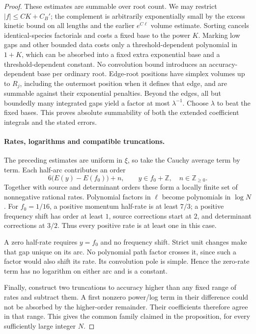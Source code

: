\begin{proof}
These estimates are summable over root count. We may restrict
\(|f|\le CK+C_B'\); the complement is arbitrarily exponentially small
by the excess kinetic bound on all lengths and the earlier
\(e^{C\ell}\) volume estimate. Sorting cancels identical-species
factorials and costs a fixed base to the power \(K\). Marking low gaps
and other bounded data costs only a threshold-dependent polynomial in
\(1+K\), which can be absorbed into a fixed extra exponential base and
a threshold-dependent constant. No convolution bound introduces an
accuracy-dependent base per ordinary root. Edge-root positions have
simplex volumes up to \(R_j\), including the outermost position when
it defines that edge, and are summable against their exponential
penalties. Beyond the edges, all but boundedly many integrated gaps
yield a factor at most \(\lambda^{-1}\). Choose \(\lambda\) to beat
the fixed bases. This proves absolute summability of both the extended
coefficient integrals and the stated errors.

\paragraph{Rates, logarithms and compatible truncations.}
The preceding estimates are uniform in \(\xi\), so take the Cauchy
average term by term. Each half-arc contributes an order
\[
 6\bigl(E(y)-E(f_0)\bigr)+n,
       \qquad y\in f_0+\mathbb Z,\quad n\in\mathbb Z_{\ge0}.
\]
Together with source and determinant orders these form a locally finite
set of nonnegative rational rates. Polynomial factors in \(\ell\)
become polynomials in \(\log N\). For \(f_0=1/16\), a positive
momentum half-rate is at least \(7/3\); a positive frequency shift has
order at least \(1\), source corrections start at \(2\), and
determinant corrections at \(3/2\). Thus every positive rate is at
least one in this case.

A zero half-rate requires \(y=f_0\) and no frequency shift. Strict
unit changes make that gap unique on its arc. No polynomial path
factor crosses it, since such a factor would also shift its rate.
Its convolution pole is simple. Hence the zero-rate term has no
logarithm on either arc and is a constant.

Finally, construct two truncations to accuracy higher than any fixed
range of rates and subtract them. A first nonzero power/log term in
their difference could not be absorbed by the higher-order remainder.
Their coefficients therefore agree in that range. This gives the
common family claimed in the proposition, for every sufficiently large
integer \(N\).
\end{proof}
